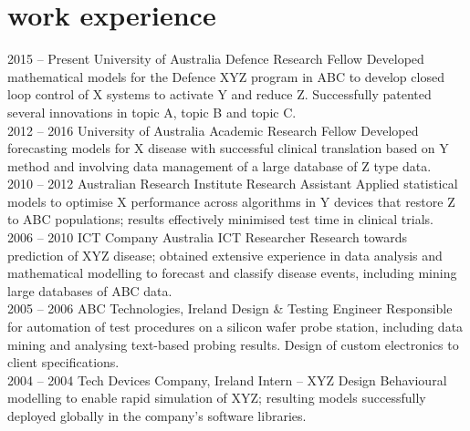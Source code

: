 \documentclass{friggeriEOSG-cv}
\begin{document}
\section{work experience}
\begin{entrylistb}

\entryb
{2015 -- {\thinfont {} Present}} %
{University of Australia}
{Defence Research Fellow}
{Developed mathematical models for the Defence XYZ program in ABC to develop closed loop control of X systems to activate Y and reduce Z.  Successfully patented several innovations in topic A, topic B and topic C.}
\\

\entryb
{2012 -- 2016}
{University of Australia}
{Academic Research Fellow}
{Developed forecasting models for X disease with successful clinical translation based on Y method and involving data management of a large database of Z type data.}
\\

\entryb
{2010 -- 2012}
{Australian Research Institute}
{Research Assistant}
{Applied statistical models to optimise X performance across algorithms in Y devices that restore Z to ABC populations; results effectively minimised test time in clinical trials.}
\\

\entryb
{2006 -- 2010}
{ICT Company Australia}
{ICT Researcher}
{Research towards prediction of XYZ disease; obtained extensive experience in data analysis and mathematical modelling to forecast and classify disease events, including mining large databases of ABC data. 
}
\\

\entryb
{2005 -- 2006}
{ABC Technologies, Ireland}
{Design \& Testing Engineer}
{Responsible for automation of test procedures on a silicon wafer probe station, including data mining and analysing text-based probing results. Design of custom electronics to client specifications.}
\\

\entryb
{2004 -- 2004}
{Tech Devices Company, Ireland}
{Intern – XYZ Design}
{Behavioural modelling to enable rapid simulation of XYZ; resulting models successfully deployed globally in the company's software libraries.} 
\end{entrylistb}
\end{document}
